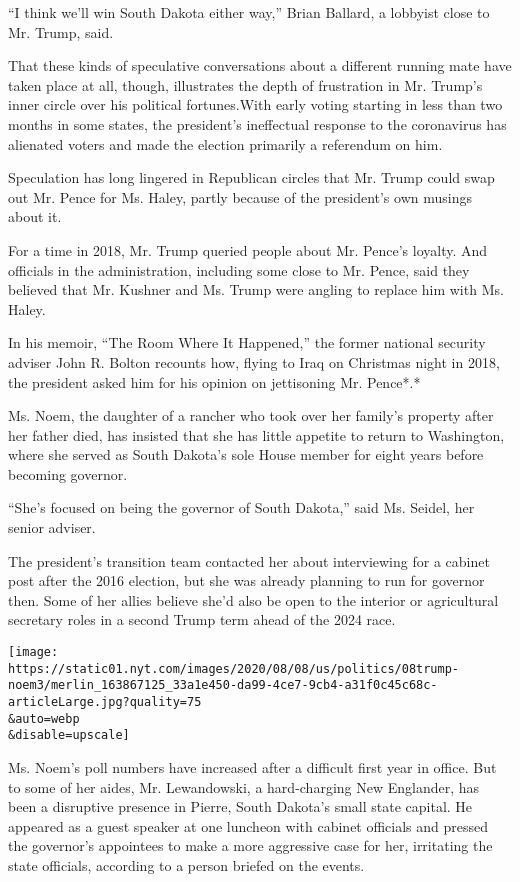 ``I think we'll win South Dakota either way,'' Brian Ballard, a lobbyist
close to Mr. Trump, said.

That these kinds of speculative conversations about a different running
mate have taken place at all, though, illustrates the depth of
frustration in Mr. Trump's inner circle over his political fortunes.With
early voting starting in less than two months in some states, the
president's ineffectual response to the coronavirus has alienated voters
and made the election primarily a referendum on him.

Speculation has long lingered in Republican circles that Mr. Trump could
swap out Mr. Pence for Ms. Haley, partly because of the president's own
musings about it.

For a time in 2018, Mr. Trump queried people about Mr. Pence's loyalty.
And officials in the administration, including some close to Mr. Pence,
said they believed that Mr. Kushner and Ms. Trump were angling to
replace him with Ms. Haley.

In his memoir, ``The Room Where It Happened,'' the former national
security adviser John R. Bolton recounts how, flying to Iraq on
Christmas night in 2018, the president asked him for his opinion on
jettisoning Mr. Pence*.*

Ms. Noem, the daughter of a rancher who took over her family's property
after her father died, has insisted that she has little appetite to
return to Washington, where she served as South Dakota's sole House
member for eight years before becoming governor.

``She's focused on being the governor of South Dakota,'' said Ms.
Seidel, her senior adviser.

The president's transition team contacted her about interviewing for a
cabinet post after the 2016 election, but she was already planning to
run for governor then. Some of her allies believe she'd also be open to
the interior or agricultural secretary roles in a second Trump term
ahead of the 2024 race.

\texttt{[image: https://static01.nyt.com/images/2020/08/08/us/politics/08trump-noem3/merlin\_163867125\_33a1e450-da99-4ce7-9cb4-a31f0c45c68c-articleLarge.jpg?quality=75\\\&auto=webp\\\&disable=upscale]}

Ms. Noem's poll numbers have increased after a difficult first year in
office. But to some of her aides, Mr. Lewandowski, a hard-charging New
Englander, has been a disruptive presence in Pierre, South Dakota's
small state capital. He appeared as a guest speaker at one luncheon with
cabinet officials and pressed the governor's appointees to make a more
aggressive case for her, irritating the state officials, according to a
person briefed on the events.

